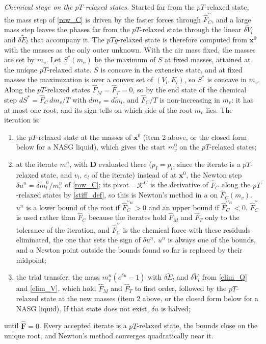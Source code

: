 \emph{Chemical stage on the $pT$-relaxed states.} Started far from the $pT$-relaxed state, the mass step of \eqref{row_C} is driven by the faster forces through $\hat{F}^{\prime\prime}_C$, and a large mass step leaves the phases far from the $pT$-relaxed state through the linear $\delta\tilde{V}_l$ and $\delta\tilde{E}_l$ that accompany it. The $pTg$-relaxed state is therefore computed from $\boldsymbol{x}^0$ with the masses as the only outer unknown. With the air mass fixed, the masses are set by $m_v$. Let $S^*(m_v)$ be the maximum of $S$ at fixed masses, attained at the unique $pT$-relaxed state. $S$ is concave in the extensive state, and at fixed masses the maximization is over a convex set of $(V_l,E_l)$, so $S^*$ is concave in $m_v$. Along the $pT$-relaxed states $\hat{F}_M=\hat{F}_T=0$, so by the end state of the chemical step $dS^*=\hat{F}_C\,dm_v/T$ with $dm_v=d\tilde{m}_l$, and $\hat{F}_C/T$ is non-increasing in $m_v$: it has at most one root, and its sign tells on which side of the root $m_v$ lies. The iteration is:
\begin{enumerate}
\item the $pT$-relaxed state at the masses of $\boldsymbol{x}^0$ (item 2 above, or the closed form below for a NASG liquid), which gives the start $m_v^0$ on the $pT$-relaxed states;
\item at the iterate $m_v^n$, with $\boldsymbol{D}$ evaluated there ($p_I=p_l$, since the iterate is a $pT$-relaxed state, and $v_l$, $e_l$ of the iterate) instead of at $\boldsymbol{x}^0$, the Newton step $\delta u^n=\delta\tilde{m}_l^n/m_v^n$ of \eqref{row_C}; its pivot $-\mathcal{K}^C$ is the derivative of $\hat{F}_C$ along the $pT$-relaxed states by \eqref{stiff_def}, so this is Newton's method in $u$ on $\hat{F}_C(m_v)$. $u^n$ is a lower bound of the root if $\hat{F}^{\prime\prime n}_C>0$ and an upper bound if $\hat{F}^{\prime\prime n}_C<0$. $\hat{F}^{\prime\prime}_C$ is used rather than $\hat{F}_C$ because the iterates hold $\hat{F}_M$ and $\hat{F}_T$ only to the tolerance of the iteration, and $\hat{F}^{\prime\prime}_C$ is the chemical force with these residuals eliminated, the one that sets the sign of $\delta u^n$. $u^n$ is always one of the bounds, and a Newton point outside the bounds found so far is replaced by their midpoint;
\item the trial transfer: the mass $m_v^n(e^{\delta u}-1)$ with $\delta\tilde{E}_l$ and $\delta\tilde{V}_l$ from \eqref{elim_Q} and \eqref{elim_V}, which hold $\hat{F}_M$ and $\hat{F}_T$ to first order, followed by the $pT$-relaxed state at the new masses (item 2 above, or the closed form below for a NASG liquid). If that state does not exist, $\delta u$ is halved;
\end{enumerate}
until $\hat{\boldsymbol{F}}=0$. Every accepted iterate is a $pT$-relaxed state, the bounds close on the unique root, and Newton's method converges quadratically near it.

